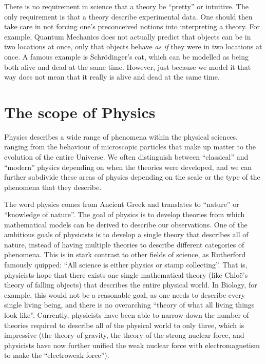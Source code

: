 There is no requirement in science that a theory be ``pretty'' or intuitive. The only requirement is that a theory describe experimental data. One should then take care in not forcing one's preconceived notions into interpreting a theory. For example, Quantum Mechanics does not actually predict that objects can be in two locations at once, only that objects behave \textit{as if} they were in two locations at once. A famous example is Schr\"odinger's cat, which can be modelled as being both alive and dead at the same time. However, just because we model it that way does not mean that it really is alive and dead at the same time. 

\section{The scope of Physics}
Physics describes a wide range of phenomena within the physical sciences, ranging from the behaviour of microscopic particles that make up matter to the evolution of the entire Universe. We often distinguish between ``classical'' and ``modern'' physics depending on when the theories were developed, and we can further subdivide these areas of physics depending on the scale or the type of the phenomena that they describe.

The word physics comes from Ancient Greek and translates to ``nature'' or ``knowledge of nature''. The goal of physics is to develop theories from which mathematical models can be derived to describe our observations. One of the ambitious goals of physicists is to develop a single theory that describes all of nature, instead of having multiple theories to describe different categories of phenomena. This is in stark contrast to other fields of science, as Rutherford famously quipped: ``All science is either physics or stamp collecting''. That is, physicists hope that there exists one single mathematical theory (like Chlo\"e's theory of falling objects) that describes the entire physical world. In Biology, for example, this would not be a reasonable goal, as one needs to describe every single living being, and there is no overarching ``theory of what all living things look like''. Currently, physicists have been able to narrow down the number of theories required to describe all of the physical world to only three, which is impressive (the theory of gravity, the theory of the strong nuclear force, and physicists have now further unified the weak nuclear force with electromagnetism to make the ``electroweak force'').


